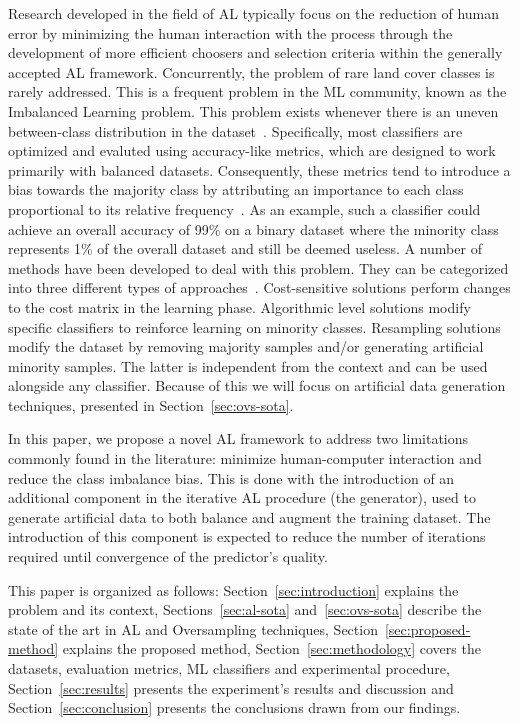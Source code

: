 \documentclass[preprint,12pt]{elsarticle}
\begin{document}
Research developed in the field of AL typically focus on the reduction of
human error by minimizing the human interaction with the process through the
development of more efficient choosers and selection criteria within the
generally accepted AL framework. Concurrently, the problem of rare land cover
classes is rarely addressed. This is a frequent problem in the ML community,
known as the Imbalanced Learning problem. This problem exists whenever there
is an uneven between-class distribution in the dataset~\cite{Chawla2004}.
Specifically, most classifiers are optimized and evaluted using accuracy-like
metrics, which are designed to work primarily with balanced datasets.
Consequently, these metrics tend to introduce a bias towards the majority
class by attributing an importance to each class proportional to its relative
frequency~\cite{Maxwell2018}. As an example, such a classifier could achieve
an overall accuracy of 99\% on a binary dataset where the minority class
represents 1\% of the overall dataset and still be deemed useless. A number of
methods have been developed to deal with this problem. They can be categorized
into three different types of approaches~\cite{Fernandez2013,Kaur2019}.
Cost-sensitive solutions perform changes to the cost matrix in the learning
phase. Algorithmic level solutions modify specific classifiers to reinforce
learning on minority classes. Resampling solutions modify the dataset by
removing majority samples and/or generating artificial minority samples. The
latter is independent from the context and can be used alongside any
classifier. Because of this we will focus on artificial data generation
techniques, presented in Section~\ref{sec:ovs-sota}.

In this paper, we propose a novel AL framework to address two limitations
commonly found in the literature: minimize human-computer interaction and
reduce the class imbalance bias. This is done with the introduction of an
additional component in the iterative AL procedure (the generator), used to
generate artificial data to both balance and augment the training dataset. The
introduction of this component is expected to reduce the number of iterations
required until convergence of the predictor's quality.

This paper is organized as follows: Section~\ref{sec:introduction} explains
the problem and its context, Sections~\ref{sec:al-sota} and~\ref{sec:ovs-sota}
describe the state of the art in AL and Oversampling techniques,
Section~\ref{sec:proposed-method} explains the proposed method,
Section~\ref{sec:methodology} covers the datasets, evaluation metrics, ML
classifiers and experimental procedure, Section~\ref{sec:results} presents the
experiment's results and discussion and Section~\ref{sec:conclusion} presents
the conclusions drawn from our findings.
\end{document}
